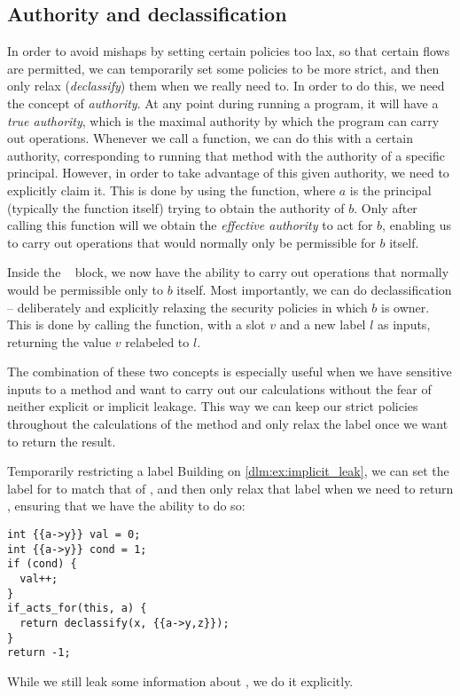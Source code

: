 \subsection{Authority and declassification}
In order to avoid mishaps by setting certain policies too lax, so that certain flows are permitted, we can temporarily set some policies to be more strict, and then only relax (\emph{declassify}) them when we really need to.
In order to do this, we need the concept of \emph{authority}.
At any point during running a program, it will have a \emph{true authority}, which is the maximal authority by which the program can carry out operations.
Whenever we call a function, we can do this with a certain authority, corresponding to running that method with the authority of a specific principal.
However, in order to take advantage of this given authority, we need to explicitly claim it.
This is done by using the \dlmactsfor{} function, where $a$ is the principal (typically the function itself) trying to obtain the authority of $b$.
Only after calling this function will we obtain the \emph{effective authority} to act for $b$, enabling us to carry out operations that would normally only be permissible for $b$ itself.

Inside the \dlmactsfor~ block, we now have the ability to carry out operations that normally would be permissible only to $b$ itself.
Most importantly, we can do declassification -- deliberately and explicitly relaxing the security policies in which $b$ is owner.
This is done by calling the \dlmdeclassify{} function, with a slot $v$ and a new label $l$ as inputs, returning the value $v$ relabeled to $l$.

The combination of these two concepts is especially useful when we have sensitive inputs to a method and want to carry out our calculations without the fear of neither explicit or implicit leakage.
This way we can keep our strict policies throughout the calculations of the method and only relax the label once we want to return the result.

\begin{example}{Temporarily restricting a label}
  Building on \cref{dlm:ex:implicit_leak}, we can set the label for  to match that of , and then only relax that label when we need to return , ensuring that we have the ability to do so:
  \begin{lstlisting}[style=dlmc]
int {{a->y}} val = 0;
int {{a->y}} cond = 1;
if (cond) {
  val++;
}
if_acts_for(this, a) {
  return declassify(x, {{a->y,z}});
}
return -1;
  \end{lstlisting}
  While we still leak some information about , we do it explicitly.
\end{example}
